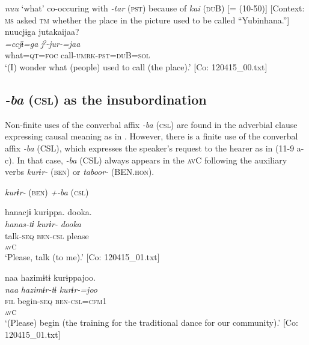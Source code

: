 \ea\label{ex:11-8}  \textit{nuu} ‘what’ co-occuring with \textit{{}-tar} (\textsc{pst}) because of \textit{kai} (\textsc{du}B) [= (10-50)]   [Context: \textsc{ms} asked \textsc{tm} whether the place in the picture used to be called “Yubinhana.”]\\
  
      \glll    nuucjɨga  jutakaijaa?\\
    \textit{=ccjɨ=ga}  \textit{jˀ-jur-=jaa}\\
    what=\textsc{qt}=\textsc{foc}  call-\textsc{umrk}-\textsc{pst}=\textsc{du}B=\textsc{sol}\\
    \glt     ‘(I) wonder what (people) used to call (the place).’ [Co: 120415\_00.txt]
\z

\subsection{\textit{{}-ba} (\textsc{csl}) as the insubordination}\label{sec:11.2.2}

Non-finite uses of the converbal affix \textit{-ba} (\textsc{csl}) are found in the adverbial clause expressing causal meaning as in . However, there is a finite use of the converbal affix \textit{-ba} (CSL), which expresses the speaker’s request to the hearer as in (11-9 a-c). In that case, \textit{{}-ba} (CSL) always appears in the \textsc{av}C following the auxiliary verbs \textit{kurɨr-} (\textsc{ben}) or \textit{taboor-} (BEN.\textsc{hon}).

\ea\label{ex:11-9}  \textit{kurɨr-} (\textsc{ben}) \textit{+-ba} (\textsc{csl})

  \ea  
      \gllll    hanacjɨ  kurɨppa.  dooka.\\
      \textit{hanas-tɨ}  \textit{kurɨr-}  \textit{dooka}\\
      talk-\textsc{seq}  \textsc{ben}-\textsc{csl}  please\\
      [Lex. verb  Aux. verb]\textsubscript{\textsc{av}C}  \\
      \glt ‘Please, talk (to me).’      [Co: 120415\_01.txt]

  \ex  
      \gllll    naa  hazimɨtɨ  kurɨppajoo.\\
      \textit{naa}  \textit{hazimɨr-tɨ}  \textit{kurɨr-=joo}\\
      \textsc{fil}  begin-\textsc{seq}  \textsc{ben}-\textsc{csl}=\textsc{cfm}1\\
        [Lex. verb  Aux. verb]\textsubscript{\textsc{av}C}\\
     \glt  ‘(Please) begin (the training for the traditional dance for our community).’      [Co: 120415\_01.txt]

